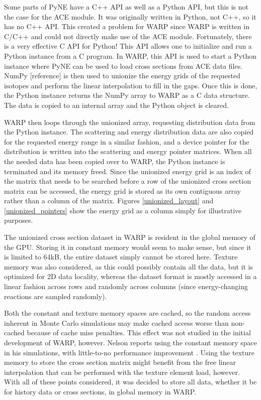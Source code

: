 Some parts of PyNE have a C++ API as well as a Python API, but this is not the case for the ACE module.  It was originally written in Python, not C++, so it has no C++ API.  This created a problem for WARP since WARP is written in C/C++ and could not directly make use of the ACE module.  Fortunately, there is a very effective C API for Python!  This API allows one to initialize and run a Python instance from a C program.  In WARP, this API is used to start a Python instance where PyNE can be used to load cross sections from ACE data files.  NumPy [reference] is then used to unionize the energy grids of the requested isotopes and perform the linear interpolation to fill in the gaps.  Once this is done, the Python instance returns the NumPy array to WARP as a C data structure.  The data is copied to an internal array and the Python object is cleared.  

WARP then loops through the unionized array, requesting distribution data from the Python instance.  The scattering and energy distribution data are also copied for the requested energy range in a similar fashion, and a device pointer for the distribution is written into the scattering and energy pointer matrices.  When all the needed data has been copied over to WARP, the Python instance is terminated and its memory freed.  Since the unionized energy grid is an index of the matrix that needs to be searched before a row of the unionized cross section matrix can be accessed, the energy grid is stored as its own contiguous array rather than a column of the matrix.  Figures \ref{unionized_layout} and \ref{unionized_pointers} show the energy grid as a column simply for illustrative purposes.

The unionized cross section dataset in WARP is resident in the global memory of the GPU.  Storing it in constant memory would seem to make sense, but since it is limited to 64kB, the entire dataset simply cannot be stored here.  Texture memory was also considered, as this could possibly contain all the data, but it is optimized for 2D data locality, whereas the dataset format is mostly accessed in a linear fashion across rows and randomly across columns (since energy-changing reactions are sampled randomly).  

Both the constant and texture memory spaces are cached, so the random access inherent in Monte Carlo simulations may make cached access worse than non-cached because of cache miss penalties.  This effect was not studied in the initial development of WARP, however.  Nelson reports using the constant memory space in his simulations, with little-to-no performance improvement \cite{nelson}.  Using the texture memory to store the cross section matrix might benefit from the free linear interpolation that can be performed with the texture element load, however.  With all of these points considered, it was decided to store all data, whether it be for history data or cross sections,  in global memory in WARP.  

